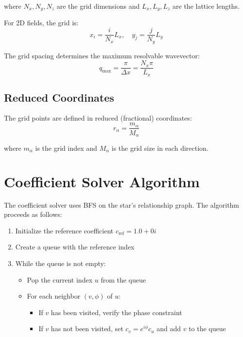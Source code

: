 where $N_x, N_y, N_z$ are the grid dimensions and $L_x, L_y, L_z$ are the lattice lengths.

For 2D fields, the grid is:
\begin{equation}
    x_i = \frac{i}{N_x} L_x, \quad y_j = \frac{j}{N_y} L_y
\end{equation}

The grid spacing determines the maximum resolvable wavevector:
\begin{equation}
    q_{\text{max}} = \frac{\pi}{\Delta x} = \frac{N_x \pi}{L_x}
\end{equation}

\subsection{Reduced Coordinates}

The grid points are defined in reduced (fractional) coordinates:
\begin{equation}
    r_\alpha = \frac{m_\alpha}{M_\alpha}
\end{equation}

where $m_\alpha$ is the grid index and $M_\alpha$ is the grid size in each direction.

\section{Coefficient Solver Algorithm}

The coefficient solver uses BFS on the star's relationship graph. The algorithm proceeds as follows:

\begin{enumerate}
    \item Initialize the reference coefficient $c_{\text{ref}} = 1.0 + 0i$
    \item Create a queue with the reference index
    \item While the queue is not empty:
    \begin{itemize}
        \item Pop the current index $u$ from the queue
        \item For each neighbor $(v, \phi)$ of $u$:
        \begin{itemize}
            \item If $v$ has been visited, verify the phase constraint
            \item If $v$ has not been visited, set $c_v = e^{i\phi} c_u$ and add $v$ to the queue
        \end{itemize}
    \end{itemize}
\end{enumerate}

